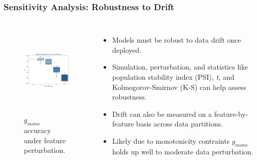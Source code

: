 \documentclass[11pt,
               aspectratio=169,
               hyperref={colorlinks}
               ]{beamer}
\begin{document}
			\begin{frame}[t]
			
				\frametitle{\textbf{Sensitivity Analysis}: Robustness to Drift}

				\begin{columns}[t]		
				
						\begin{figure}
							\begin{center}
								\includegraphics[height=125pt]{../img/robust.png}
								\caption{$g_{mono}$ accuracy under feature perturbation.}		
							\end{center}
						\end{figure}
					
						\begin{itemize}\small
							\item Models must be robust to data drift once deployed.
							\item Simulation, perturbation, and statistics like population stability index (PSI), \textit{t}, and Kolmogorov-Smirnov (K-S) can help assess robustness.
							\item Drift can also be measured on a feature-by-feature basis across data partitions.
							\item Likely due to monotonicity contraints $g_{mono}$ holds up well to moderate data perturbation. 
						\end{itemize}
					
				\end{columns}
				
			\end{frame}
			
\end{document}
